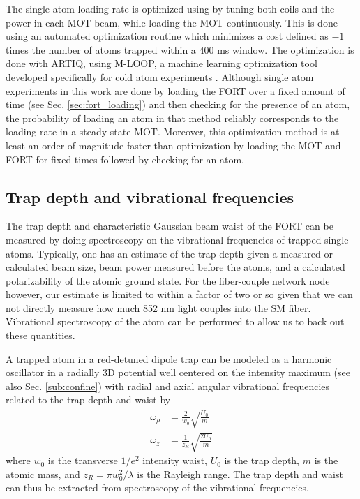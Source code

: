 The single atom loading rate is optimized using by tuning both coils and the power in each MOT beam, while loading the MOT continuously. This is done using an automated optimization routine which minimizes a cost defined as $-1$ times the number of atoms trapped within a 400 ms window. The optimization is done with ARTIQ, using M-LOOP, a machine learning optimization tool developed specifically for cold atom experiments \cite{Wigley2016}. Although single atom experiments in this work are done by loading the FORT over a fixed amount of time (see Sec. \ref{sec:fort_loading}) and then checking for the presence of an atom, the probability of loading an atom in that method reliably corresponds to the loading rate in a steady state MOT. Moreover, this optimization method is at least an order of magnitude faster than optimization by loading the MOT and FORT for fixed times followed by checking for an atom. 

\subsection{Trap depth and vibrational frequencies}

The trap depth and characteristic Gaussian beam waist of the FORT can be measured by doing spectroscopy on the vibrational frequencies of trapped single atoms. Typically, one has an estimate of the trap depth given a measured or calculated beam size, beam power measured before the atoms, and a calculated polarizability of the atomic ground state. For the fiber-couple network node however, our estimate is limited to within a factor of two or so given that we can not directly measure how much 852 nm light couples into the SM fiber. Vibrational spectroscopy of the atom can be performed to allow us to back out these quantities.

A trapped atom in a red-detuned dipole trap can be modeled as a harmonic oscillator in a radially 3D potential well centered on the intensity maximum (see also Sec. \ref{sub:confine}) with radial and axial angular vibrational frequencies related to the trap depth and waist by
\begin{align}\label{eq:trapfreqs}
    \omega_{\rho} &= \frac{2}{w_0}\sqrt{\frac{U_0}{m}} \\
    \omega_z &= \frac{1}{z_R}\sqrt{\frac{2U_0}{m}}
\end{align}
where $w_0$ is the transverse $1/e^2$ intensity waist, $U_0$ is the trap depth, $m$ is the atomic mass, and $z_R=\pi w_0^2/\lambda$ is the Rayleigh range. The trap depth and waist can thus be extracted from spectroscopy of the vibrational frequencies. 

